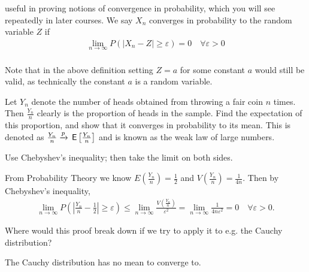  useful in proving notions of convergence in probability, which you will see repeatedly in later courses.
We say $X_n$ converges in probability to the random variable $Z$ if
\begin{align*}
    \lim_{n\rightarrow\infty}P(\left|X_n-Z\right| \geq \varepsilon) = 0\quad\forall\varepsilon>0
\end{align*}\\
Note that in the above definition setting $Z=a$ for some constant $a$ would still be valid, as technically the constant $a$ is a random variable.

\begin{exercise}
Let $Y_n$ denote the number of heads obtained from throwing a fair coin $n$ times. Then $\frac{Y_n}{n}$ clearly is the proportion of heads in the sample. Find the expectation of this proportion, and show that it converges in probability to its mean. This is denoted as $\frac{Y_n}{n}\xrightarrow{p}\,\mathsf{E}\left[\frac{Y_n}{n}\right]$ and is known as the weak law of large numbers.\\
\begin{hint}
Use Chebyshev's inequality;  then take the limit on both sides.
\end{hint}
\begin{solution}
From Probability Theory we know $E\left(\frac{Y_n}{n}\right)=\frac12$ and $V\left(\frac{Y_n}{n}\right) = \frac{1}{4 n}$. Then by Chebyshev's inequality,
\begin{align*}
    \lim_{n\rightarrow\infty}P\left(\left|\frac{Y_n}{n}-\frac12\right| \geq \varepsilon\right) \leq  \lim_{n\rightarrow\infty}\frac{V\left(\frac{Y_n}{n}\right)}{\varepsilon^2} =  \lim_{n\rightarrow\infty}\frac{1}{4n\varepsilon^2} = 0\quad\forall\varepsilon>0.
\end{align*}
\end{solution}
\end{exercise}

\begin{exercise}
Where would this proof break down if we try to apply it to e.g. the Cauchy distribution?
\begin{solution}
The Cauchy distribution has no mean to converge to.
\end{solution}
\end{exercise}


